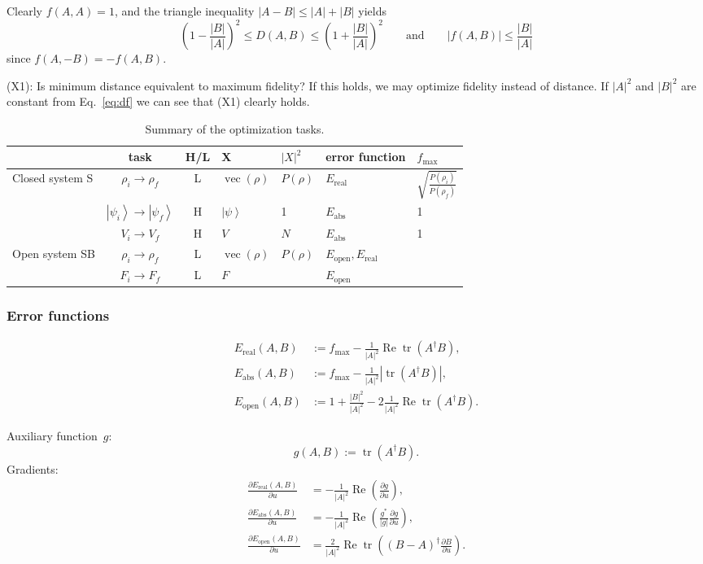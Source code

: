 \documentclass[aps, pra, a4paper, longbibliography]{revtex4}
\newcommand{\be}{\begin{equation}}
\newcommand{\ee}{\end{equation}}
\newcommand{\ket}[1]{\left| #1 \right \rangle}
\DeclareMathOperator{\tr}{tr}
\DeclareMathOperator{\re}{Re}
\DeclareMathOperator{\cvec}{vec}
\newcommand{\dd}[2]{\frac{\partial #1}{\partial #2}}
\begin{document}
Clearly $f(A, A) = 1$, and
the triangle inequality $|A-B| \le |A|+|B|$ yields
\be
\left(1 -\frac{|B|}{|A|} \right)^2 \le D(A, B) \le \left(1 +\frac{|B|}{|A|} \right)^2
\qquad \text{and} \qquad
|f(A, B)|
\le \frac{|B|}{|A|}
\ee
since $f(A, -B) = -f(A, B)$.


(X1): Is minimum distance equivalent to maximum fidelity?
If this holds, we may optimize fidelity instead of distance.
If $|A|^2$ and $|B|^2$ are constant
from Eq.~\eqref{eq:df} we can see that (X1) clearly holds.






\begin{table}
\begin{tabular}{l|c|c|l|l|l|l}
& task & H/L & X & $|X|^2$ & error function & $f_\text{max}$\\
\hline
Closed system S
& $\rho_i \to \rho_f$ & L & $\cvec(\rho)$ & $P(\rho)$
& $E_\text{real}$ & $\sqrt{\frac{P(\rho_i)}{P(\rho_f)}}$\\
& $\ket{\psi_i} \to \ket{\psi_f}$ & H & $\ket{\psi}$ & 1 &
$E_\text{abs}$ & 1\\
& $V_i \to V_f$ & H & $V$ & $N$ & $E_\text{abs}$ & 1\\
\hline
Open system SB
& $\rho_i \to \rho_f$ & L & $\cvec(\rho)$ & $P(\rho)$ &
$E_\text{open}, E_\text{real}$\\
& $F_i \to F_f$ & L & $F$ &  & $E_\text{open}$\\
\end{tabular}
\caption{Summary of the optimization tasks.}
\label{table:tasks}
\end{table}


\subsubsection{Error functions}

\begin{align}
E_\text{real}(A, B) &:= f_\text{max} -\frac{1}{|A|^2} \re \tr(A^\dagger B),\\
E_\text{abs}(A, B) &:= f_\text{max} -\frac{1}{|A|^2} |\tr(A^\dagger B)|,\\
E_\text{open}(A, B) &:= 1 +\frac{|B|^2}{|A|^2} -2 \frac{1}{|A|^2} \re \tr(A^\dagger B).
\end{align}


Auxiliary function~$g$:
\be
g(A, B) := \tr(A^\dagger B).
\ee
Gradients:
\begin{align}
\dd{E_\text{real}(A,B)}{u}
&= -\frac{1}{|A|^2} \re \left( \dd{g}{u} \right),\\
\dd{E_\text{abs}(A,B)}{u}
&= -\frac{1}{|A|^2} \re \left(\frac{g^*}{|g|} \dd{g}{u} \right),\\
\dd{E_\text{open}(A, B)}{u}
&= \frac{2}{|A|^2} \re \tr\left((B-A)^\dagger \dd{B}{u}\right).
\end{align}
\end{document}

